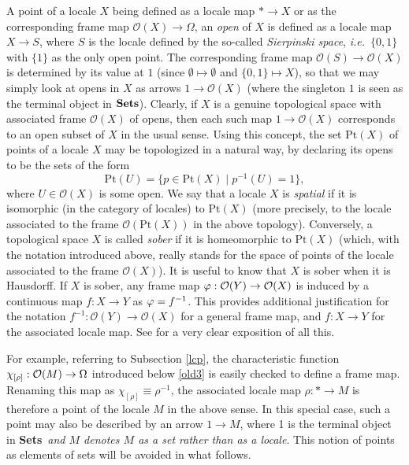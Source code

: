 \documentclass[12pt]{article}
\newcommand{\beq}{\begin{equation}}
\newcommand{\eeq}{\end{equation}}
\newcommand{\Sets}{\mbox{\textbf{Sets}}}
\newcommand{\raw}{\rightarrow} \newcommand{\rat}{\mapsto}
\newcommand{\inv}{^{-1}}
\newcommand{\er}{\eqref}
\newcommand{\rh}{\rho} \newcommand{\sg}{\sigma}
\newcommand{\ch}{\chi} \newcommand{\ps}{\psi} \newcommand{\Ps}{\Psi}
\newcommand{\CO}{{\mathcal O}} \newcommand{\CP}{{\mathcal P}}
\newcommand{\ie}{\textit{i.e.}}
\begin{document}
A point of a locale $X$ being defined as a locale map $*\raw X$ or as the corresponding
frame map $\CO(X)\raw\Omega$, an {\it open} of $X$ is defined as a  locale map $X\raw S$, where $S$ is the locale defined by the so-called {\it Sierpinski space}, \ie\ $\{0,1\}$ with $\{1\}$ as the only open point.
The corresponding frame map $\CO(S)\raw \CO(X)$ is determined by its  value at $1$ (since $\emptyset\mapsto\emptyset$ and $\{0,1\}\mapsto X$), so that we may simply look at opens in $X$ as arrows
 $1\raw \CO(X)$ (where the singleton $1$ is seen as the terminal object in $\Sets$).   Clearly, if $X$ is a genuine topological space with associated frame $\CO(X)$ of opens, then
each such map $1\raw \CO(X)$ corresponds to an open subset of $X$ in the usual
sense. Using this concept, the set $\mathrm{Pt}(X)$ of points of a locale $X$
may be topologized in a natural way, by declaring its opens to be
the sets of the form
\beq
\mathrm{Pt}(U)=\{p\in \mathrm{Pt}(X)\mid p\inv(U)=1\}, \label{openpt}\eeq
 where  $U\in \CO(X)$ is some open.  We say that a locale $X$ is {\it spatial}
if it is isomorphic (in the category of locales) to
$\mathrm{Pt}(X)$ (more precisely, to the locale associated to the frame
$\CO(\mathrm{Pt}(X))$ in the above topology). Conversely, a topological space
$X$ is called {\it sober} if it is homeomorphic to $\mathrm{Pt}(X)$
 (which, with the notation introduced above, really stands for the space of
points of the locale associated to the frame $\CO(X)$). It is useful to know
that $X$ is sober when it is Hausdorff. If $X$ is sober, any frame map
$\phv:\CO(Y)\raw \CO(X)$ is induced by a continuous map $f:X\raw Y$ as
$\phv=f\inv$. This provides additional justification for the notation $f\inv:
\CO(Y)\raw \CO(X)$ for a general frame map, and
$f:X\raw Y$ for the associated locale map. See \cite[\S IX.3]{maclanemoerdijk92}
for a very clear exposition of all this.

For example, referring to Subsection \ref{lcp}, the characteristic function
$\ch_{[\rho]}:\CO(M)\raw\Om$ introduced below \er{old3} is easily checked to
define a frame map. Renaming this map
as $\ch_{[\rho]}\equiv\rh\inv$, the associated locale map $\rh: *\raw M$ is
therefore a point of the locale $M$ in the above sense. In this special case,
such a point may also be described by an arrow $1\raw M$, where 1 is the
terminal object in \Sets\ {\it and $M$ denotes $M$ as a set rather than as a
locale}. This notion of points as elements of sets will be avoided in what
follows.
\end{document}
